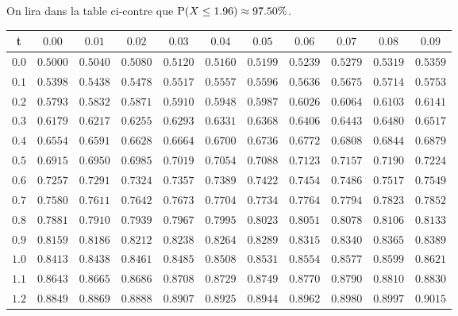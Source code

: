\begin{center}
\begin{exemple}{}{}
	On lira dans la table ci-contre que $\operatorname{P}(X \leq 1.96)\approx 97.50\%$.
\end{exemple}

\begin{tabular}{| c | c | c | c | c | c | c | c | c | c | c |}
	\hline
	t & $0.00$ & $0.01$ & $0.02$ & $0.03$ & $0.04$ & $0.05$ & $0.06$ & $0.07$ & $0.08$ & $0.09$  \\
	\hline
	$0.0$ & $0.5000$ & $0.5040$ & $0.5080$ & $0.5120$ & $0.5160$ & $0.5199$ & $0.5239$ & $0.5279$ & $0.5319$ & $0.5359$ \\
	$0.1$ & $0.5398$ & $0.5438$ & $0.5478$ & $0.5517$ & $0.5557$ & $0.5596$ & $0.5636$ & $0.5675$ & $0.5714$ & $0.5753$ \\
	$0.2$ & $0.5793$ & $0.5832$ & $0.5871$ & $0.5910$ & $0.5948$ & $0.5987$ & $0.6026$ & $0.6064$ & $0.6103$ & $0.6141$ \\
	$0.3$ & $0.6179$ & $0.6217$ & $0.6255$ & $0.6293$ & $0.6331$ & $0.6368$ & $0.6406$ & $0.6443$ & $0.6480$ & $0.6517$ \\
	$0.4$ & $0.6554$ & $0.6591$ & $0.6628$ & $0.6664$ & $0.6700$ & $0.6736$ & $0.6772$ & $0.6808$ & $0.6844$ & $0.6879$ \\
	$0.5$ & $0.6915$ & $0.6950$ & $0.6985$ & $0.7019$ & $0.7054$ & $0.7088$ & $0.7123$ & $0.7157$ & $0.7190$ & $0.7224$ \\
	$0.6$ & $0.7257$ & $0.7291$ & $0.7324$ & $0.7357$ & $0.7389$ & $0.7422$ & $0.7454$ & $0.7486$ & $0.7517$ & $0.7549$ \\
	$0.7$ & $0.7580$ & $0.7611$ & $0.7642$ & $0.7673$ & $0.7704$ & $0.7734$ & $0.7764$ & $0.7794$ & $0.7823$ & $0.7852$ \\
	$0.8$ & $0.7881$ & $0.7910$ & $0.7939$ & $0.7967$ & $0.7995$ & $0.8023$ & $0.8051$ & $0.8078$ & $0.8106$ & $0.8133$ \\
	$0.9$ & $0.8159$ & $0.8186$ & $0.8212$ & $0.8238$ & $0.8264$ & $0.8289$ & $0.8315$ & $0.8340$ & $0.8365$ & $0.8389$ \\
	\hline
	$1.0$ & $0.8413$ & $0.8438$ & $0.8461$ & $0.8485$ & $0.8508$ & $0.8531$ & $0.8554$ & $0.8577$ & $0.8599$ & $0.8621$ \\
	$1.1$ & $0.8643$ & $0.8665$ & $0.8686$ & $0.8708$ & $0.8729$ & $0.8749$ & $0.8770$ & $0.8790$ & $0.8810$ & $0.8830$ \\
	$1.2$ & $0.8849$ & $0.8869$ & $0.8888$ & $0.8907$ & $0.8925$ & $0.8944$ & $0.8962$ & $0.8980$ & $0.8997$ & $0.9015$ \\

\end{tabular}
\end{center}
